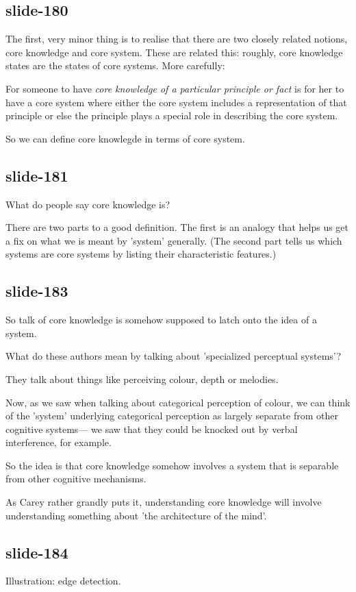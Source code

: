 \documentclass[12pt,\papersize]{extarticle}
\begin{document}
\subsection{slide-180}
The first, very minor thing is to realise that there are two closely related notions, core 
knowledge and core system.
These are related this: roughly, core knowledge states are the states of core systems.  More 
carefully:
 
For someone to have \textit{core knowledge of a particular principle or fact} is for her to have a core system where 
either the core system includes a representation of that principle or else the principle plays a special role in describing the core system.
 
So we can define core knowlegde in terms of core system.
 
\subsection{slide-181}
What do people say core knowledge is?
 
There are two parts to a good definition.  The first is an analogy that helps us get a fix on what we is meant by 'system' generally.  (The second part tells us which systems are core systems by listing their characteristic features.)
 
\subsection{slide-183}
So talk of core knowledge is somehow supposed to latch onto the idea of a system.
 
What do these authors mean by talking about 'specialized perceptual systems'?
 
They talk about things like perceiving colour, depth or melodies.
 
Now, as we saw when talking about categorical perception of colour, we can think of the 'system' underlying categorical perception as largely separate from other cognitive systems--- we saw that they could be knocked out by verbal interference, for example.
 
So the idea is that core knowledge somehow involves a system that is separable from other cognitive mechanisms.
 
As Carey rather grandly puts it, understanding core knowledge will involve understanding something about 'the architecture of the mind'.
 
\subsection{slide-184}
Illustration: edge detection.
 
\end{document}
